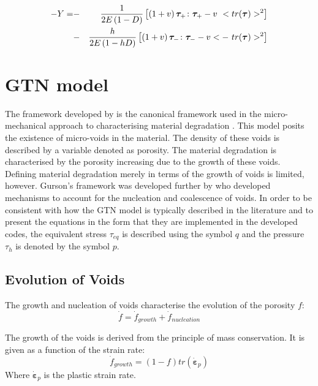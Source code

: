 \documentclass[sn-mathphys,Numbered,draft]{sn-jnl}%
\begin{document}
\begin{eqnarray}
	-Y=&-&\frac{1}{2E\left(1-D\right)}\left[\left(1+v\right)\boldsymbol{\tau}_+\colon\boldsymbol{\tau}_+-v\ <tr(\boldsymbol{\tau})>^2\right] \notag \\
	&-&\frac{h}{2E\left(1-hD\right)}\left[\left(1+v\right)\boldsymbol{\tau}_-\colon\boldsymbol{\tau}_--v<-\ tr(\boldsymbol{\tau})>^2\right]
\end{eqnarray}

\section{GTN model}

The framework developed by \citet{gurson_continuum_1977} is the canonical framework used in the micro-mechanical approach to characterising material degradation \cite{besson_continuum_2010,cao_models_2017,tekkaya_damage_2020}. This model posits the existence of micro-voids in the material. The density of these voids is described by a variable denoted as porosity. The material degradation is characterised by the porosity increasing due to the growth of these voids. Defining material degradation merely in terms of the growth of voids is limited, however. Gurson’s framework was developed further by \citet{tvergaard_analysis_1984} who developed mechanisms to account for the nucleation and coalescence of voids. In order to be consistent with how the GTN model is typically described in the literature \cite{bettaieb_numerical_2011,achouri_numerical_2013} and to present the equations in the form that they are implemented in the developed codes, the equivalent stress $\tau_{eq}$ is described using the symbol $q$ and the pressure $\tau_h$ is denoted by the symbol $p$. 
\subsection{Evolution of Voids}

The growth and nucleation of voids characterise the evolution of the porosity $f$:
\begin{equation}
	\dot{f}=\dot{f}_{growth}+\dot{f}_{nucleation}	
\end{equation}	

The growth of the voids is derived from the principle of mass conservation. It is given as a function of the strain rate:
\begin{equation}
	\dot{f}_{growth}=\left(1-f\right)tr\left(\dot{\boldsymbol{\varepsilon}}_p\right)	
\end{equation}
 Where $\dot{\boldsymbol{\varepsilon}}_p$ is the plastic strain rate. 
    
\end{document}
